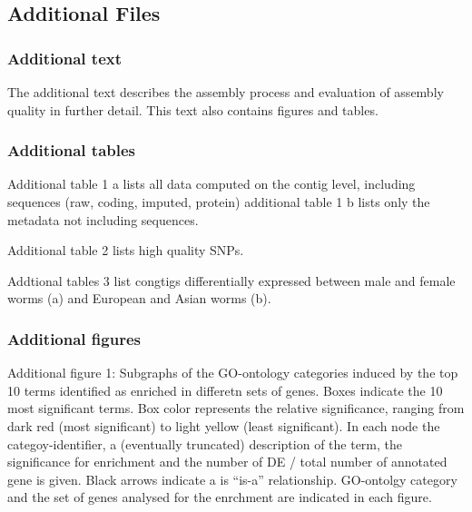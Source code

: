 \documentclass[10pt]{bmc_article}
\newenvironment{bmcformat}{\begin{raggedright}\baselineskip20pt\sloppy\setboolean{publ}{false}}{\end{raggedright}\baselineskip20pt\sloppy}
\begin{document}
\begin{bmcformat}

\subsection*{Additional Files}

\subsubsection*{Additional text}
The additional text describes the assembly process and evaluation of
assembly quality in further detail. This text also contains figures
and tables.

\subsubsection*{Additional tables}

Additional table 1 a lists all data computed on the contig level,
including sequences (raw, coding, imputed, protein) additional table 1
b lists only the metadata not including sequences.

Additional table 2 lists high quality SNPs.

Addtional tables 3 list congtigs differentially expressed between male
and female worms (a) and European and Asian worms (b).


\subsubsection*{Additional figures}
Additional figure 1: Subgraphs of the GO-ontology categories induced
by the top 10 terms identified as enriched in differetn sets of
genes. Boxes indicate the 10 most significant terms. Box color
represents the relative significance, ranging from dark red (most
significant) to light yellow (least significant). In each node the
categoy-identifier, a (eventually truncated) description of the term,
the significance for enrichment and the number of DE / total number of
annotated gene is given. Black arrows indicate a is ``is-a''
relationship. GO-ontolgy category and the set of genes analysed for
the enrchment are indicated in each figure.

\end{bmcformat}
\end{document}
